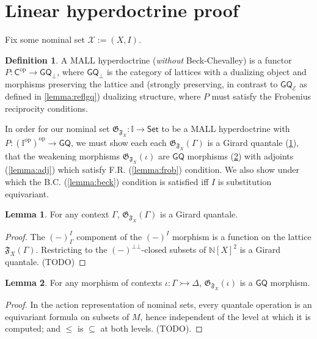 \documentclass{article}
\theoremstyle{definition}
\newtheorem{definition}{Definition}[section]
\newtheorem{lemma}{Lemma}[section]
\newcommand{\N}{\mathbb{N}}
\newcommand{\II}{\mathbb{I}}
\newcommand{\F}{\mathfrak{F}}
\newcommand{\G}{\mathfrak{G}}
\newcommand{\cE}{\mathcal{E}}
\newcommand{\cX}{\mathcal{X}}
\newcommand{\cat}[1]{\mathsf{#1}}
\newcommand{\op}{\operatorname{op}}
\newcommand{\catC}{\cat{C}}
\newcommand{\Set}{\cat{Set}}
\begin{document}
\section{Linear hyperdoctrine proof}
\label{sec:hyper}

Fix some nominal set $\cX:=(X,I)$.

\begin{definition}
    A MALL hyperdoctrine ({\it without} Beck-Chevalley) is a functor $P:\catC^{\op}\to \cat{GQ}_\bot$, where $\cat{GQ}_\bot$ is the category of lattices with a dualizing object and morphisms preserving the lattice and (strongly preserving, in contrast to $\cat{GQ_\cE}$ as defined in \cref{lemma:reflgq}) dualizing structure, where $P$ must satisfy the Frobenius reciprocity conditions.
\end{definition}

In order for our nominal set $\G_{\F_X}\colon \II\to\Set$ to be a MALL hyperdoctrine with $P: (\II^{\op})^{\op}\to\cat{GQ}$, we must show each each  $\G_{\F_X}(\Gamma)$ is a Girard quantale (\cref{lemma:quant}), that the weakening morphisms $\G_{\F_X}(\iota)$ are $\cat{GQ}$ morphisms (\cref{lemma:quanthom}) with adjoints (\cref{lemma:adj}) which satisfy F.R. (\cref{lemma:frob}) condition. We also show under which the B.C. (\cref{lemma:beck}) condition is satisfied iff $I$ is substitution equivariant. 

\begin{lemma}
    \label{lemma:quant}
    For any context $\Gamma$, $\G_{\F_X}(\Gamma)$ is a Girard quantale.
\end{lemma}

\begin{proof}
    The $(-)^I_\Gamma$ component of the $(-)^I$ morphism is a function on the lattice $\F_X(\Gamma)$. Restricting to the $(-)^{\bot\bot}$-closed subsets of $\N[X]^2$ is a Girard quantale. (TODO)
\end{proof}

\begin{lemma}
    \label{lemma:quanthom}
    For any morphism of contexts $\iota\colon \Gamma\rightarrowtail \Delta$, $\G_{\F_X}(\iota)$ is a $\cat{GQ}$ morphism.
\end{lemma}
\begin{proof}
      In the action representation of nominal sets, every quantale operation is an equivariant formula on subsets of $M$, hence independent of the level at which it is computed; and $\leq$ is $\subseteq$ at both levels. (TODO).
\end{proof}
\end{document}
